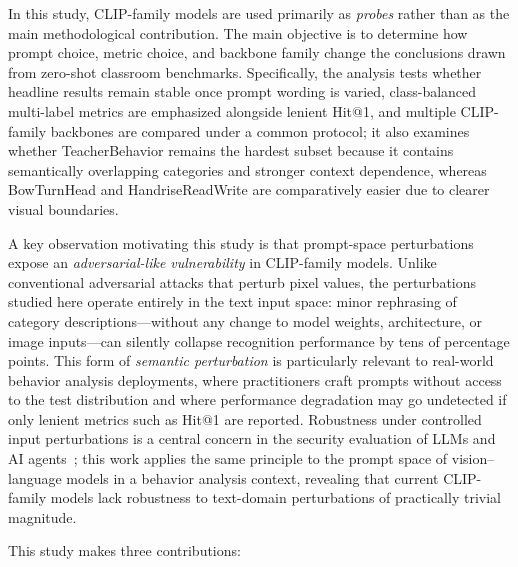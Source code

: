 \documentclass[symmetry,article,submit,pdftex,moreauthors]{Definitions/mdpi}
\begin{document}
In this study, CLIP-family models are used primarily as \emph{probes} rather than as the main methodological contribution. The main objective is to determine how prompt choice, metric choice, and backbone family change the conclusions drawn from zero-shot classroom benchmarks. Specifically, the analysis tests whether headline results remain stable once prompt wording is varied, class-balanced multi-label metrics are emphasized alongside lenient Hit@1, and multiple CLIP-family backbones are compared under a common protocol; it also examines whether TeacherBehavior remains the hardest subset because it contains semantically overlapping categories and stronger context dependence, whereas BowTurnHead and HandriseReadWrite are comparatively easier due to clearer visual boundaries.

A key observation motivating this study is that prompt-space perturbations expose an \emph{adversarial-like vulnerability} in CLIP-family models. Unlike conventional adversarial attacks that perturb pixel values, the perturbations studied here operate entirely in the text input space: minor rephrasing of category descriptions---without any change to model weights, architecture, or image inputs---can silently collapse recognition performance by tens of percentage points. This form of \emph{semantic perturbation} is particularly relevant to real-world behavior analysis deployments, where practitioners craft prompts without access to the test distribution and where performance degradation may go undetected if only lenient metrics such as Hit@1 are reported. Robustness under controlled input perturbations is a central concern in the security evaluation of LLMs and AI agents~\cite{zhou2025security_llm,deng2025ai_agents}; this work applies the same principle to the prompt space of vision--language models in a behavior analysis context, revealing that current CLIP-family models lack robustness to text-domain perturbations of practically trivial magnitude.

This study makes three contributions:
\end{document}

